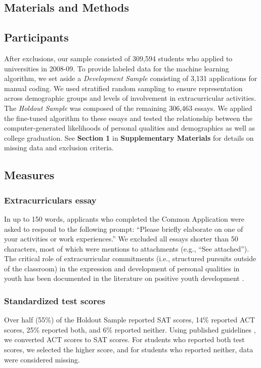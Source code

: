 \documentclass[11pt]{report}
\begin{document}
\begin{mainf}
\section{Materials and Methods}

\subsection{Participants}
After exclusions, our sample consisted of 309,594 students who applied to universities in 2008-09. To provide labeled data for the machine learning algorithm, we set aside a \textit{Development Sample} consisting of 3,131 applications for manual coding. We used stratified random sampling to ensure representation across demographic groups and levels of involvement in extracurricular activities. The \textit{Holdout Sample} was composed of the remaining 306,463 essays. We applied the fine-tuned algorithm to these essays and tested the relationship between the computer-generated likelihoods of personal qualities and demographics as well as college graduation. See \textbf{Section 1} in \textbf{Supplementary Materials} for details on missing data and exclusion criteria. 

\subsection{Measures}

\subsubsection{Extracurriculars essay}
In up to 150 words, applicants who completed the Common Application were asked to respond to the following prompt: “Please briefly elaborate on one of your activities or work experiences.” We excluded all essays shorter than 50 characters, most of which were mentions to attachments (e.g., “See attached”). The critical role of extracurricular commitments (i.e., structured pursuits outside of the classroom) in the expression and development of personal qualities in youth has been documented in the literature on positive youth development \cite{mahoney_organized_2005,larson_toward_2000}.

\subsubsection{Standardized test scores}
Over half (55\%) of the Holdout Sample reported SAT scores, 14\% reported ACT scores, 25\% reported both, and 6\% reported neither. Using published guidelines \cite{act_actsat_2013}, we converted ACT scores to SAT scores. For students who reported both test scores, we selected the higher score, and for students who reported neither, data were considered missing.


\end{mainf}
\end{document}
